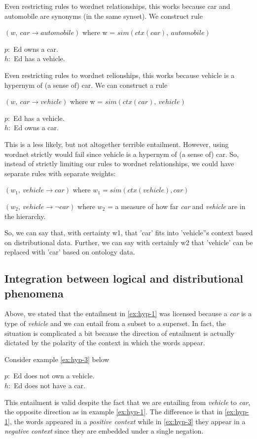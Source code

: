 Even restricting rules to wordnet relationships, this works because car and
automobile are synonyms (in the same synset).
We construct rule 

$(w,~ car \to automobile)$ where w = $sim(ctx(car),~ automobile)$


\begin{example}\label{ex:hyp-1}
$p:$ Ed owns a car. \\
$h:$ Ed has a vehicle.
\end{example}

Even restricting rules to wordnet relionships, this works because vehicle is a
hypernym of (a sense of) car.
We can construct a rule 

$(w,~ car \to vehicle)$ where w = $sim(ctx(car),~ vehicle)$

\begin{example}\label{ex:hyp-2}
$p:$ Ed has a vehicle. \\
$h:$ Ed owns a car.
\end{example}

This is a less likely, but not altogether terrible entailment.
However, using wordnet strictly would fail since vehicle is a hypernym of (a
sense of) car.
So, instead of strictly limiting our rules to wordnet relationships, we could
have separate rules with separate weights:

$(w_1,~ vehicle \to car)$ where $w_1 = sim(ctx(vehicle), car)$ 

$(w_2,~ vehicle \to \lnot car)$ where $w_2$ = a measure of how far {\it car} and
{\it vehicle} are in the hierarchy.

So, we can say that, with certainty w1, that 'car' fits into 'vehicle''s context
based on distributional data.
Further, we can say with certainly w2 that 'vehicle' can be replaced with 'car'
based on ontology data.



\subsection*{Integration between logical and distributional phenomena}

Above, we stated that the entailment in \eqref{ex:hyp-1} was licensed because a
{\it car} is a type of {\it vehicle} and we can entail from a subset to a
superset.  In fact, the situation is complicated a bit because the direction of
entailment is actually dictated by the polarity of the context in which the
words appear.

Consider example \eqref{ex:hyp-3} below
\begin{example}\label{ex:hyp-3}
$p:$ Ed does not own a vehicle. \\
$h:$ Ed does not have a car.
\end{example}
This entailment is valid despite the fact that we are entailing from {\it
vehicle} to {\it car}, the opposite direction as in example \eqref{ex:hyp-1}. 
The difference is that in \eqref{ex:hyp-1}, the words appeared in a {\it
positive context} while in \eqref{ex:hyp-3} they appear in a {\it
negative context} since they are embedded under a single negation.

